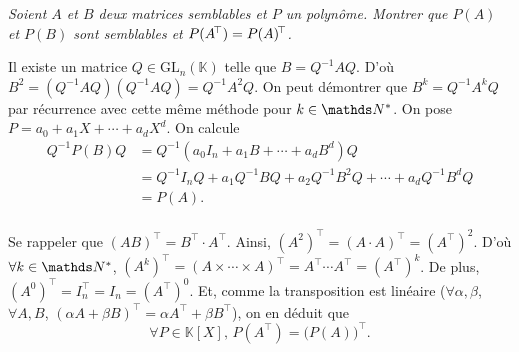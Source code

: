 \begin{exo}
	\slshape Soient $A$\/ et $B$\/ deux matrices semblables et $P$\/ un polynôme. Montrer que $P(A)$\/ et $P(B)$\/ sont semblables et $P(A^{\!\!\,\top}) = P(A)^{\!\!\,\top}$.\upshape

	Il existe un matrice $Q \in \mathrm{GL}_n(\mathds{K})$\/ telle que $B = Q^{-1}AQ$. D'où $B^2 = (Q^{-1} AQ)(Q^{-1} A Q) = Q^{-1} A^2 Q$. On peut démontrer que $B^k = Q^{-1} A^k Q$\/ par récurrence avec cette même méthode pour $k \in \N^*$.
	On pose $P = a_0 + a_1 X + \cdots + a_d X^d$.
	On calcule
	\begin{align*}
		Q^{-1}P(B) Q &= Q^{-1}(a_0I_n + a_1 B + \cdots + a_d B^d) Q \\
		&= Q^{-1} I_n Q + a_1 Q^{-1} B Q + a_2 Q^{-1} B^2 Q + \cdots + a_d Q^{-1} B^d Q \\
		&= P(A). \\
	\end{align*}

	Se rappeler que $(AB)^\top = B^\top\cdot A^\top$. Ainsi, $(A^2)^\top = (A \cdot A)^\top  =(A^\top)^2$. D'où $\forall k \in \N^*$, $(A^k)^\top = (A \times \cdots \times A)^\top = A^\top \cdots A^\top = (A^\top )^k$.
	De plus, $(A^0)^\top = I_n^\top = I_n = (A^\top)^0$. Et, comme la transposition est linéaire ($\forall \alpha, \beta$, $\forall A,B$, $(\alpha A + \beta B)^\top = \alpha A^\top + \beta B^\top$), on en déduit que \[
		\forall P \in \mathds{K}[X],\,P(A^\top) = \big(P(A)\big)^\top
	.\]
\end{exo}

